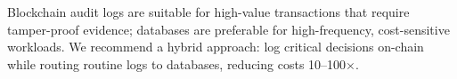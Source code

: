 \documentclass[conference]{IEEEtran}
\begin{document}


Blockchain audit logs are suitable for high-value transactions that require tamper-proof evidence; databases are preferable for high-frequency, cost-sensitive workloads. We recommend a hybrid approach: log critical decisions on-chain while routing routine logs to databases, reducing costs 10--100$\times$.
\end{document}
